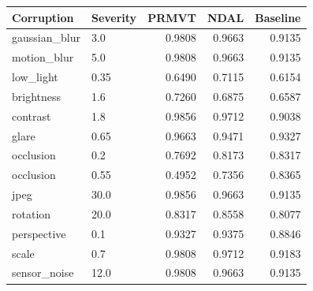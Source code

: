 \begin{tabular}{llrrr}
\hline
Corruption & Severity & PRMVT & NDAL & Baseline \\
\hline
gaussian_blur & 3.0 & 0.9808 & 0.9663 & 0.9135 \\
motion_blur & 5.0 & 0.9808 & 0.9663 & 0.9135 \\
low_light & 0.35 & 0.6490 & 0.7115 & 0.6154 \\
brightness & 1.6 & 0.7260 & 0.6875 & 0.6587 \\
contrast & 1.8 & 0.9856 & 0.9712 & 0.9038 \\
glare & 0.65 & 0.9663 & 0.9471 & 0.9327 \\
occlusion & 0.2 & 0.7692 & 0.8173 & 0.8317 \\
occlusion & 0.55 & 0.4952 & 0.7356 & 0.8365 \\
jpeg & 30.0 & 0.9856 & 0.9663 & 0.9135 \\
rotation & 20.0 & 0.8317 & 0.8558 & 0.8077 \\
perspective & 0.1 & 0.9327 & 0.9375 & 0.8846 \\
scale & 0.7 & 0.9808 & 0.9712 & 0.9183 \\
sensor_noise & 12.0 & 0.9808 & 0.9663 & 0.9135 \\
\hline
\end{tabular}

